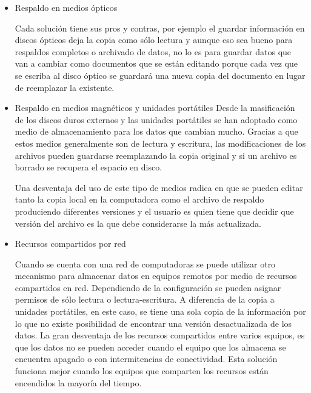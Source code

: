     \begin{itemize}
    
      \item Respaldo en medios \'{opticos}


Cada soluci\'{o}n tiene sus pros y contras, por ejemplo el guardar informaci\'{o}n en discos \'{o}pticos deja la copia como s\'{o}lo lectura y aunque eso sea bueno para respaldos completos o archivado de datos, no lo es para guardar datos que van a cambiar como documentos que se est\'{a}n editando porque cada vez que se escriba al disco \'{o}ptico se guardar\'{a} una nueva copia del documento en lugar de reemplazar la existente.

      \item Respaldo en medios magn\'{e}ticos y unidades port\'{a}tiles
Desde la masificaci\'{o}n de los discos duros externos y las unidades port\'{a}tiles se han adoptado como medio de almacenamiento para los datos que cambian mucho. Gracias a que estos medios generalmente son de lectura y escritura, las modificaciones de los archivos pueden guardarse reemplazando la copia original y si un archivo es borrado se recupera el espacio en disco.

Una desventaja del uso de este tipo de medios radica en que se pueden editar tanto la copia local en la computadora como el archivo de respaldo produciendo diferentes versiones y el usuario es quien tiene que decidir que versi\'{o}n del archivo es la que debe considerarse la m\'{a}s actualizada.

      \item Recursos compartidos por red

Cuando se cuenta con una red de computadoras se puede utilizar otro mecanismo para almacenar datos en equipos remotos por medio de recursos compartidos en red. Dependiendo de la configuraci\'{o}n se pueden asignar permisos de s\'{o}lo lectura o lectura-escritura. A diferencia de la copia a unidades port\'{a}tiles, en este caso, se tiene una sola copia de la informaci\'{o}n por lo que no existe posibilidad de encontrar una versi\'{o}n desactualizada de los datos. La gran desventaja de los recursos compartidos entre varios equipos, es que los datos no se pueden acceder cuando el equipo que los almacena se encuentra apagado o con intermitencias de conectividad. Esta soluci\'{o}n funciona mejor cuando los equipos que comparten los recursos est\'{a}n encendidos la mayor\'{i}a del tiempo.


\end{itemize}
